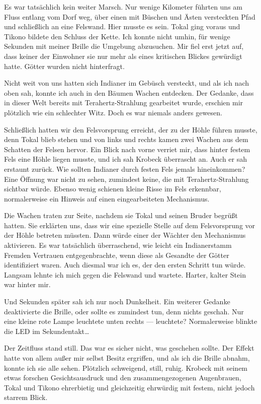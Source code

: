 Es war tatsächlich kein weiter Marsch. Nur wenige Kilometer führten uns am Fluss entlang vom Dorf weg, über einen mit Büschen und Ästen versteckten Pfad und schließlich an eine Felswand. Hier musste es sein. Tokal ging voraus und Tikono bildete den Schluss der Kette. Ich konnte nicht umhin, für wenige Sekunden mit meiner Brille die Umgebung abzusuchen. Mir fiel erst jetzt auf, dass keiner der Einwohner sie nur mehr als eines kritischen Blickes gewürdigt hatte. Götter wurden nicht hinterfragt.

Nicht weit von uns hatten sich Indianer im Gebüsch versteckt, und als ich nach oben sah, konnte ich auch in den Bäumen Wachen entdecken. Der Gedanke, dass in dieser Welt bereits mit Terahertz-Strahlung gearbeitet wurde, erschien mir plötzlich wie ein schlechter Witz. Doch es war niemals anders gewesen.

Schließlich hatten wir den Felsvorsprung erreicht, der zu der Höhle führen musste, denn Tokal blieb stehen und von links und rechts kamen zwei Wachen aus dem Schatten der Felsen hervor. Ein Blick nach vorne verriet mir, dass hinter festem Fels eine Höhle liegen musste, und ich sah Krobeck überrascht an. Auch er sah erstaunt zurück. Wie sollten Indianer durch festen Fels jemals hineinkommen? Eine Öffnung war nicht zu sehen, zumindest keine, die mit Terahertz-Strahlung sichtbar würde. Ebenso wenig schienen kleine Risse im Fels erkennbar, normalerweise ein Hinweis auf einen eingearbeiteten Mechanismus.

Die Wachen traten zur Seite, nachdem sie Tokal und seinen Bruder begrüßt hatten. Sie erklärten uns, dass wir eine spezielle Stelle auf dem Felsvorsprung vor der Höhle betreten müssten. Dann würde einer der Wächter den Mechanismus aktivieren. Es war tatsächlich überraschend, wie leicht ein Indianerstamm Fremden Vertrauen entgegenbrachte, wenn diese als Gesandte der Götter identifiziert waren. Auch diesmal war ich es, der den ersten Schritt tun würde. Langsam lehnte ich mich gegen die Felswand und wartete. Harter, kalter Stein war hinter mir.

Und Sekunden später sah ich nur noch Dunkelheit. Ein weiterer Gedanke deaktivierte die Brille, oder sollte es zumindest tun, denn nichts geschah. Nur eine kleine rote Lampe leuchtete unten rechts --- leuchtete? Normalerweise blinkte die LED im Sekundentakt\dots{}

Der Zeitfluss stand still. Das war es sicher nicht, was geschehen sollte. Der Effekt hatte von allem außer mir selbst Besitz ergriffen, und als ich die Brille abnahm, konnte ich sie alle sehen. Plötzlich schweigend, still, ruhig. Krobeck mit seinem etwas forschen Gesichtsausdruck und den zusammengezogenen Augenbrauen, Tokal und Tikono ehrerbietig und gleichzeitig ehrwürdig mit festem, nicht jedoch starrem Blick.

